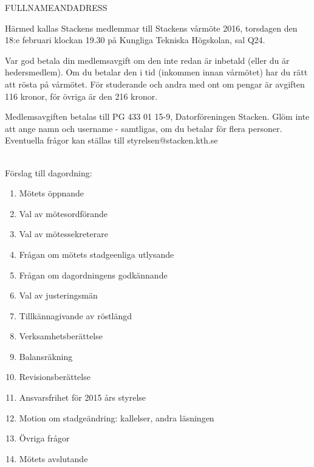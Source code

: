 \documentclass[fontsize=11pt,enlargefirstpage,firstfoot=false,a4paper,pagenumber=no]{scrlttr2}
\begin{document}
 
\begin{letter}{FULLNAMEANDADRESS}

\opening{Härmed kallas Stackens medlemmar till Stackens vårmöte 2016, torsdagen den 18:e februari klockan 19.30 på Kungliga Tekniska Högskolan, sal Q24.}

Var god betala din medlemsavgift om den inte redan är inbetald (eller du är hedersmedlem). Om du betalar den i tid (inkommen innan vårmötet) har du rätt att rösta på vårmötet. För studerande och andra med ont om pengar är avgiften 116 kronor, för övriga är den 216 kronor.

Medlemsavgiften betalas till PG 433 01 15-9, Datorföreningen Stacken. Glöm inte att ange namn och username - samtligas, om du betalar för flera personer. Eventuella frågor kan ställas till styrelsen@stacken.kth.se

~\\
Förslag till dagordning:

\begin{multicols}{3}
\begin{enumerate}
	\itemsep0em
	\item  Mötets öppnande
	\item  Val av mötesordförande
	\item  Val av mötessekreterare
	\item  Frågan om mötets stadgeenliga utlysande
	\item  Frågan om dagordningens godkännande
	\item  Val av justeringsmän
	\item  Tillkännagivande av röstlängd
	\item  Verksamhetsberättelse
	\item  Balansräkning
	\item  Revisionsberättelse
	\item  Ansvarsfrihet för 2015 års styrelse
	\item  Motion om stadgeändring: kallelser, andra läsningen
	\item  Övriga frågor
	\item  Mötets avslutande
\end{enumerate}
\end{multicols}

\closing{}
\enlargethispage{3\baselineskip}

\end{letter}
\end{document}
